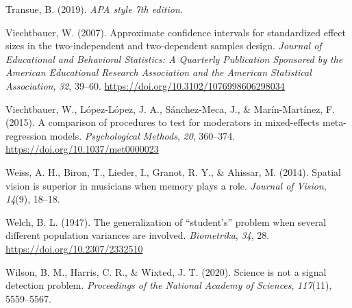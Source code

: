 \documentclass[
  man,floatsintext]{apa7}
\newlength{\cslhangindent}
\newlength{\cslentryspacingunit} %
\newenvironment{CSLReferences}[2] %
 {%
  \setlength{\parindent}{0pt}
  \ifodd #1
  \let\oldpar\par
  \def\par{\hangindent=\cslhangindent\oldpar}
  \fi
  \setlength{\parskip}{#2\cslentryspacingunit}
 }%
 {}
\begin{document}
\begin{CSLReferences}{1}{0}
\leavevmode{}%
Transue, B. (2019). \emph{APA style 7th edition}.

\leavevmode{}%
Viechtbauer, W. (2007). Approximate confidence intervals for standardized effect sizes in the two-independent and two-dependent samples design. \emph{Journal of Educational and Behavioral Statistics: A Quarterly Publication Sponsored by the American Educational Research Association and the American Statistical Association}, \emph{32}, 39--60. \url{https://doi.org/10.3102/1076998606298034}

\leavevmode{}%
Viechtbauer, W., López-López, J. A., Sánchez-Meca, J., \& Marín-Martínez, F. (2015). A comparison of procedures to test for moderators in mixed-effects meta-regression models. \emph{Psychological Methods}, \emph{20}, 360--374. \url{https://doi.org/10.1037/met0000023}

\leavevmode{}%
Weiss, A. H., Biron, T., Lieder, I., Granot, R. Y., \& Ahissar, M. (2014). Spatial vision is superior in musicians when memory plays a role. \emph{Journal of Vision}, \emph{14}(9), 18--18.

\leavevmode{}%
Welch, B. L. (1947). The generalization of {``student's''} problem when several different population variances are involved. \emph{Biometrika}, \emph{34}, 28. \url{https://doi.org/10.2307/2332510}

\leavevmode{}%
Wilson, B. M., Harris, C. R., \& Wixted, J. T. (2020). Science is not a signal detection problem. \emph{Proceedings of the National Academy of Sciences}, \emph{117}(11), 5559--5567.

\end{CSLReferences}
\end{document}
